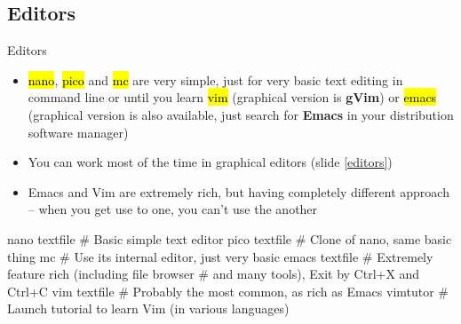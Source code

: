 \documentclass[compress, ucs, xelatex, 11pt, xcolor=svgnames,
  hyperref={
    bookmarks=true,
    unicode=true,
    colorlinks=true,
    pdftitle={Linux, command line and MetaCentrum},
    plainpages=false,
    pdfauthor={Vojtech Zeisek},
    pdfsubject={Course about use of Linux command line, writing shell scripts and using MetaCentrum of CESNET},
    pdfcreator={XeLaTeX},
    pdfkeywords={Linux, GNU, BASH, shell, command line, MetaCentrum},
    linkcolor=Red,
    anchorcolor=Blue,
    citecolor=Purple,
    filecolor=DodgerBlue,
    menucolor=DarkOrchid,
    urlcolor=DeepSkyBlue,
    pdftex},
  url={hyphens, lowtilde} %
  ]{beamer}
\renewcommand{\texttt}[1]{\hl{\ttfamily #1}}
\begin{document}
\subsection{Editors} 

\begin{frame}[fragile]{Editors}
\begin{itemize}
 \item \texttt{nano}, \texttt{pico} and \texttt{mc} are very simple, just for very basic text editing in command line or until you learn \texttt{vim} (graphical version is \textbf{gVim}) or \texttt{emacs} (graphical version is also available, just search for \textbf{Emacs} in your distribution software manager)
 \item You can work most of the time in graphical editors (slide \ref{editors})
 \item Emacs and Vim are extremely rich, but having completely different approach -- when you get use to one, you can't use the another
\end{itemize}
  \begin{bashcode}
    nano textfile # Basic simple text editor
    pico textfile # Clone of nano, same basic thing
    mc # Use its internal editor, just very basic
    emacs textfile # Extremely feature rich (including file browser
                   # and many tools), Exit by Ctrl+X and Ctrl+C
    vim textfile # Probably the most common, as rich as Emacs
    vimtutor # Launch tutorial to learn Vim (in various languages)
   \end{bashcode}
\end{frame}
\end{document}
